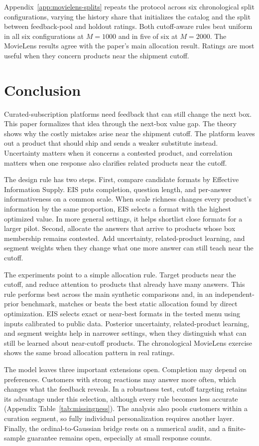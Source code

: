 \documentclass[11pt]{article}
\theoremstyle{definition}
\theoremstyle{remark}
\newcommand{\1}{\mathbf{1}}
\begin{document}
Appendix~\ref{app:movielens-splits} repeats the protocol across six
chronological split configurations, varying the history share that
initializes the catalog and the split between feedback-pool and holdout
ratings. Both cutoff-aware rules beat uniform in all six configurations
at \(M=1000\) and in five of six at \(M=2000\). The MovieLens
results agree with the paper's main allocation result. Ratings are most
useful when they concern products near the shipment cutoff.


\section{Conclusion}
Curated-subscription platforms need feedback that can still change the
next box. This
paper formalizes that idea through the next-box value gap. The theory shows why the costly mistakes arise near the shipment cutoff.
The platform leaves out a product that should ship and sends a weaker
substitute instead. Uncertainty matters when it concerns a contested
product, and correlation matters when one response also clarifies
related products near the cutoff.

The design rule has two steps. First, compare candidate formats by
Effective Information Supply. EIS puts completion, question length, and
per-answer informativeness on a common scale. When scale richness changes every product's information by the same
proportion, EIS selects a format with the highest optimized value. In more general settings, it helps shortlist
close formats for a larger pilot. Second,
allocate the answers that arrive to products whose box membership remains
contested. Add uncertainty, related-product learning, and segment weights
when they change what one more answer can still teach near the cutoff.

The experiments point to a simple allocation rule. Target products near
the cutoff, and reduce attention to products that already have many
answers. This rule performs best across the main synthetic comparisons
and, in an independent-prior benchmark, matches or beats the best static
allocation found by direct optimization. EIS selects exact or near-best
formats in the tested menu using inputs calibrated to public data.
Posterior uncertainty, related-product learning, and segment weights
help in narrower settings, when they distinguish what can still be
learned about near-cutoff products. The chronological MovieLens exercise
shows the same broad allocation pattern in real ratings.

The model leaves three important extensions open. Completion may depend on preferences. Customers with strong reactions
may answer more often, which changes what the feedback reveals. In a robustness test, cutoff
targeting retains its advantage under this selection, although every
rule becomes less accurate (Appendix Table~\ref{tab:missingness}). The
analysis also pools customers within a curation segment, so fully
individual personalization requires another layer. Finally, the ordinal-to-Gaussian bridge rests on a numerical audit, and
a finite-sample guarantee remains open, especially at small response
counts.
\end{document}
